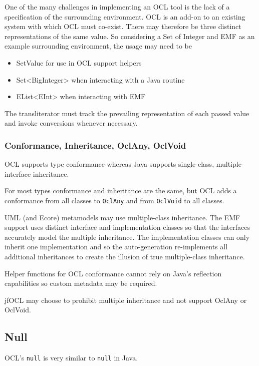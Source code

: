 \documentclass[sigconf]{acmart}
\begin{document}
One of the many challenges in implementing an OCL tool is the lack of a specification of the surrounding environment. OCL is an add-on to an existing system with which OCL must co-exist. There may therefore be three distinct representations of the same value. So considering a Set of Integer and EMF as an example surrounding environment, the usage may need to be

\begin{itemize}
	\item SetValue for use in OCL support helpers
	\item Set<BigInteger> when interacting with a Java routine
	\item EList<EInt> when interacting with EMF
\end{itemize}

The transliterator must track the prevailing representation of each passed value and invoke conversions whenever necessary.

\subsubsection{Conformance, Inheritance, OclAny, OclVoid}\label{Conformance}

OCL supports type conformance whereas Java supports single-class, multiple-interface inheritance.

For most types conformance and inheritance are the same, but OCL adds a conformance from all classes to \texttt{OclAny} and from \texttt{OclVoid} to all classes.

UML\cite{UML-2.0} (and Ecore) metamodels may use multiple-class inheritance. The EMF\cite{Eclipse-EMF} support uses distinct interface and implementation classes so that the interfaces accurately model the multiple inheritance. The implementation classes can only inherit one implementation and so the auto-generation re-implements all additional inheritances to create the illusion of true multiple-class inheritance.

Helper functions for OCL conformance cannot rely on Java's reflection capabilities so custom metadata may be required.

jfOCL may choose to prohibit multiple inheritance and not support OclAny or OclVoid.

\subsection{Null}

OCL's \texttt{null} is very similar to \texttt{null} in Java.
\end{document}
